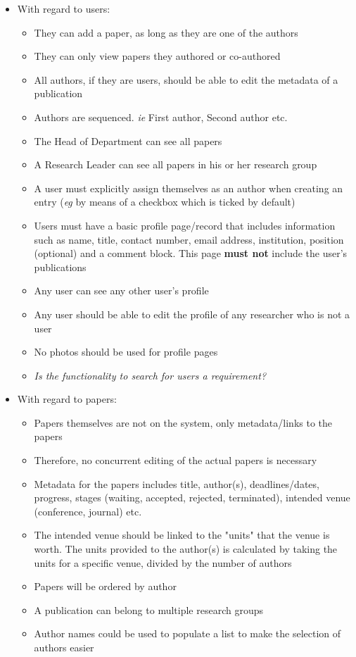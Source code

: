 \documentclass[a4paper,12pt]{article}
\begin{document}
\begin{itemize}
\item With regard to users:
\begin{itemize}
\item They can add a paper, as long as they are one of the authors
\item They can only view papers they authored or co-authored
\item All authors, if they are users, should be able to edit the metadata of a publication
\item Authors are sequenced. \textit{ie} First author, Second author etc.
\item The Head of Department can see all papers
\item A Research Leader can see all papers in his or her research group
\item A user must explicitly assign themselves as an author when creating an entry (\textit{eg} by means of a checkbox which is ticked by default)
\item Users must have a basic profile page/record that includes information such as name, 
title, contact number, email address, institution, position (optional) and a comment block. This page \textbf{must not} include the user's publications
\item Any user can see any other user's profile
\item Any user should be able to edit the profile of any researcher who is not a user
\item No photos should be used for profile pages
\item \textit{Is the functionality to search for users a requirement?}
\end{itemize}

\item With regard to papers:
\begin{itemize}
\item Papers themselves are not on the system, only metadata/links to the papers
\item Therefore, no concurrent editing of the actual papers is necessary
\item Metadata for the papers includes title, author(s), deadlines/dates, progress, stages (waiting, accepted, rejected, terminated), intended venue (conference, journal) etc.
\item The intended venue should be linked to the "units" that the venue is worth. The units provided to the author(s) is calculated by taking the units for a specific venue, divided by the number of authors
\item Papers will be ordered by author
\item A publication can belong to multiple research groups
\item Author names could be used to populate a list to make the selection of authors easier
\end{itemize}


\end{itemize}
\end{document}

